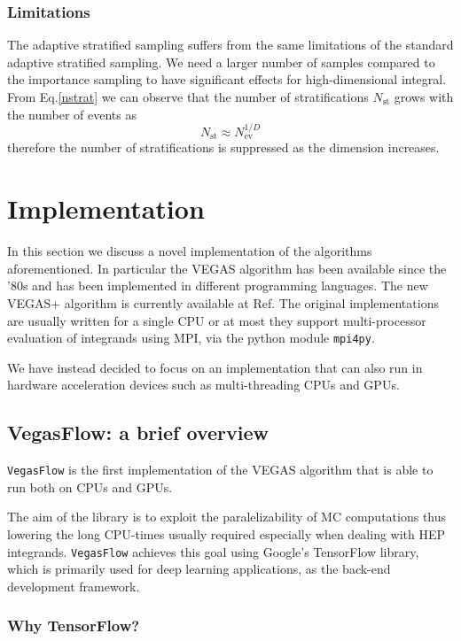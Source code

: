 \documentclass[../main/main.tex]{subfiles}
\begin{document}
\subsubsection{Limitations}
The adaptive stratified sampling suffers from the same limitations of the standard adaptive stratified sampling.
We need a larger number of samples compared to the importance sampling  to have significant effects for high-dimensional integral.
From Eq.\eqref{nstrat} we can observe that the number of stratifications $N_\text{st}$ grows with the number of events as 
\begin{equation}
	N_\text{st} \approx N_\text{ev}^{1/D}
\end{equation}
therefore the number of stratifications is suppressed as the dimension increases. 


 


\section{Implementation}
In this section we discuss a novel implementation of the algorithms aforementioned.
In particular the VEGAS algorithm has been available since the '80s and has been implemented in different programming languages.
The new VEGAS+ algorithm is currently available at Ref\cite{peter_lepage_2021_4746454}.
The original implementations are usually written for a single CPU or at most they support multi-processor evaluation of integrands using
MPI, via the python module \texttt{mpi4py}.

We have instead decided to focus on an implementation that can also run in hardware acceleration devices such as multi-threading CPUs and GPUs.

\subsection{VegasFlow: a brief overview}
\texttt{VegasFlow} \cite{vegasflow_package} is the first implementation of the VEGAS algorithm that is able to run both on CPUs and GPUs.
 
The aim of the library is to exploit the paralelizability of MC computations thus lowering the long CPU-times usually required especially when
dealing with HEP integrands.
 \texttt{VegasFlow} achieves this goal using Google's TensorFlow library, which is primarily used for deep learning applications, as the back-end development framework. 

\subsubsection{Why TensorFlow?}
\label{tensorflow}
\end{document}
